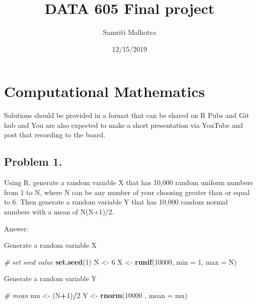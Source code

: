 \documentclass[]{article}
\title{DATA 605 Final project}
\author{Samriti Malhotra}
\date{12/15/2019}
\newenvironment{Shaded}{\begin{snugshade}}{\end{snugshade}}
\newcommand{\CommentTok}[1]{\textcolor[rgb]{0.56,0.35,0.01}{\textit{#1}}}
\newcommand{\DataTypeTok}[1]{\textcolor[rgb]{0.13,0.29,0.53}{#1}}
\newcommand{\DecValTok}[1]{\textcolor[rgb]{0.00,0.00,0.81}{#1}}
\newcommand{\KeywordTok}[1]{\textcolor[rgb]{0.13,0.29,0.53}{\textbf{#1}}}
\newcommand{\NormalTok}[1]{#1}
\newcommand{\OperatorTok}[1]{\textcolor[rgb]{0.81,0.36,0.00}{\textbf{#1}}}
\newcommand{\StringTok}[1]{\textcolor[rgb]{0.31,0.60,0.02}{#1}}
\begin{document}
\maketitle

\hypertarget{computational-mathematics}{%
\section{Computational Mathematics}\label{computational-mathematics}}

Solutions should be provided in a format that can be shared on R Pubs
and Git hub and You are also expected to make a short presentation via
YouTube and post that recording to the board.

\hypertarget{problem-1.}{%
\subsection{Problem 1.}\label{problem-1.}}

Using R, generate a random variable X that has 10,000 random uniform
numbers from 1 to N, where N can be any number of your choosing greater
than or equal to 6. Then generate a random variable Y that has 10,000
random normal numbers with a mean of N(N+1)/2.

Answer:

Generate a random variable X

\begin{Shaded}
\begin{Highlighting}[]
\CommentTok{# set seed value}
\KeywordTok{set.seed}\NormalTok{(}\DecValTok{1}\NormalTok{)}
\NormalTok{N <-}\StringTok{ }\DecValTok{6}
\NormalTok{X <-}\StringTok{ }\KeywordTok{runif}\NormalTok{(}\DecValTok{10000}\NormalTok{, }\DataTypeTok{min =} \DecValTok{1}\NormalTok{, }\DataTypeTok{max =}\NormalTok{ N)}
\end{Highlighting}
\end{Shaded}

Generate a random variable Y

\begin{Shaded}
\begin{Highlighting}[]
\CommentTok{# mean }
\NormalTok{mu <-}\StringTok{ }\NormalTok{(N}\OperatorTok{+}\DecValTok{1}\NormalTok{)}\OperatorTok{/}\DecValTok{2}
\NormalTok{Y <-}\StringTok{ }\KeywordTok{rnorm}\NormalTok{(}\DecValTok{10000}\NormalTok{ , }\DataTypeTok{mean =}\NormalTok{ mu)}
\end{Highlighting}
\end{Shaded}
\end{document}
